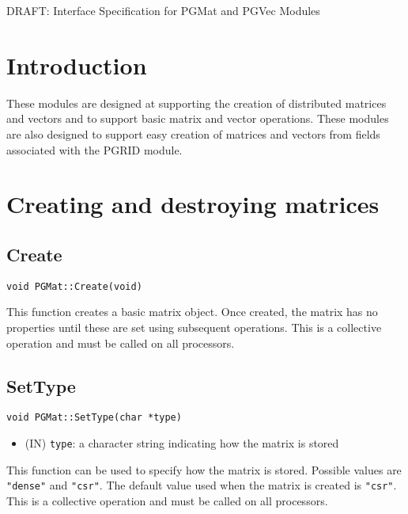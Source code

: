 \documentclass[12pt]{article}
\begin{document}
\begin{titlepage}
\begin{center}
{\LARGE DRAFT: Interface Specification for PGMat and PGVec Modules}
\end{center}
\end{titlepage}
\newpage
\pagestyle{plain}
\section{Introduction}
These modules are designed at supporting the creation of distributed matrices
and vectors and to support basic matrix and vector operations. These modules are
also designed to support easy creation of matrices and vectors from fields
associated with the PGRID module.
\section{Creating and destroying matrices}
\subsection{Create}
\begin{verbatim}
void PGMat::Create(void)
\end{verbatim}
This function creates a basic matrix object. Once created, the matrix has no
properties until these are set using subsequent operations. This is a collective
operation and must be called on all processors.
\subsection{SetType}
\begin{verbatim}
void PGMat::SetType(char *type)
\end{verbatim}
\begin{itemize}
\item (IN) \texttt{type}: a character string indicating how the matrix is stored
\end{itemize}
This function can be used to specify how the matrix is stored. Possible values
are \texttt{"dense"} and \texttt{"csr"}. The default value used when the matrix
is created is \texttt{"csr"}. This is a collective operation and must be called
on all processors.
\end{document}
